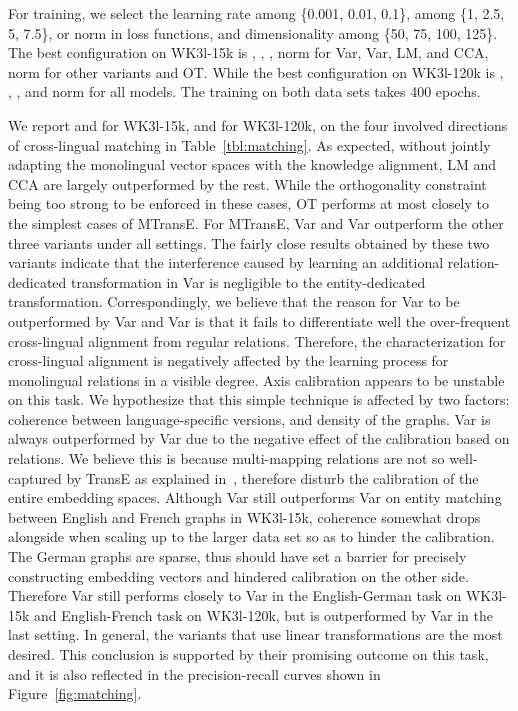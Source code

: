 \documentclass{article}
\begin{document}
For training,  we select the learning rate  among \{0.001, 0.01, 0.1\},  among \{1, 2.5, 5, 7.5\},  or  norm in loss functions, and dimensionality  among \{50, 75, 100, 125\}. The best configuration on WK3l-15k is , , ,  norm for Var, Var, LM, and CCA,  norm for other variants and OT. While the best configuration on WK3l-120k is , , , and  norm for all models. The training on both data sets takes 400 epochs. \par

 We report  and  for WK3l-15k, and  for WK3l-120k, on the four involved directions of cross-lingual matching in Table~\ref{tbl:matching}. As expected, without jointly adapting the monolingual vector spaces with the knowledge alignment, LM and CCA are largely outperformed by the rest. While the orthogonality constraint being too strong to be enforced in these cases, OT performs at most closely to the simplest cases of MTransE. For MTransE, Var and Var outperform the other three variants under all settings. The fairly close results obtained by these two variants indicate that the interference caused by learning an additional relation-dedicated transformation in Var is negligible to the entity-dedicated transformation. Correspondingly, we believe that the reason for Var to be outperformed by Var and Var is that it fails to differentiate well the over-frequent cross-lingual alignment from regular relations. Therefore, the characterization for cross-lingual alignment is negatively affected by the learning process for monolingual relations in a visible degree. Axis calibration appears to be unstable on this task. We hypothesize that this simple technique is affected by two factors: coherence between language-specific versions, and density of the graphs. Var is always outperformed by Var due to the negative effect of the calibration based on relations. We believe this is because multi-mapping relations are not so well-captured by TransE as explained in~\cite{wang2014knowledge}, therefore disturb the calibration of the entire embedding \mbox{spaces}. Although Var still outperforms Var on entity matching between English and French graphs in WK3l-15k, coherence somewhat drops alongside when scaling up to the larger data set so as to hinder the calibration. The German graphs are \mbox{sparse}, thus should have set a barrier for precisely constructing embedding vectors and hindered calibration on the other side. Therefore Var still performs closely to Var in the English-German task on WK3l-15k and English-French task on WK3l-120k, but is outperformed by Var in the last setting. In general, the variants that use linear transformations are the most desired. This conclusion is supported
by their promising outcome on this task, and it is also reflected in the precision-recall curves shown in Figure~\ref{fig:matching}.
\end{document}
